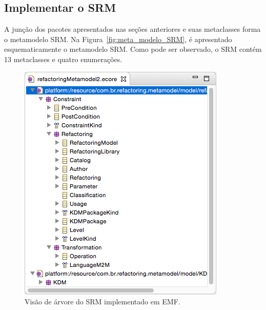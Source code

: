 


\subsection{Implementar o SRM}\label{sec:implementacao_do_SRM}

A junção dos pacotes apresentados nas seções anteriores e suas metaclasses forma o metamodelo SRM. Na Figura~\ref{fig:meta_modelo_SRM}, é apresentado esquematicamente o metamodelo SRM. Como pode ser observado, o SRM contém 13 metaclasses e quatro enumerações. 

\begin{figure}[h]
	\centering
	\caption{Visão de árvore do SRM implementado em EMF.}
	\label{fig:visao_arvore_srm_emf}
	\includegraphics[scale=0.65]{images/srm_emf}
	\fautor
\end{figure}


